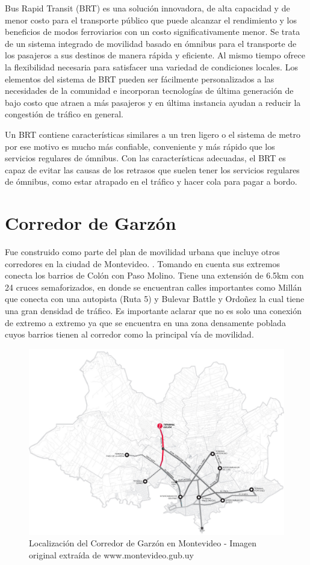 Bus Rapid Transit (BRT) es una solución innovadora, de alta capacidad y de menor costo para el transporte público que puede alcanzar el rendimiento y los beneficios de modos ferroviarios con un costo significativamente menor. Se trata de un sistema integrado de movilidad basado en ómnibus para el transporte de los pasajeros a sus destinos de manera rápida y eficiente. Al mismo tiempo ofrece la flexibilidad necesaria para satisfacer una variedad de condiciones locales. Los elementos del sistema de BRT pueden ser fácilmente personalizados a las necesidades de la comunidad e incorporan tecnologías de última generación de bajo costo que atraen a más pasajeros y en última instancia ayudan a reducir la congestión de tráfico en general.

Un BRT contiene características similares a un tren ligero o el sistema de metro por ese motivo es mucho más confiable, conveniente y más rápido que los servicios regulares de ómnibus. Con las características adecuadas, el BRT es capaz de evitar las causas de los retrasos que suelen tener los servicios regulares de ómnibus, como estar atrapado en el tráfico y hacer cola para pagar a bordo. 


	
\section{Corredor de Garzón}	


Fue construido como parte del plan de movilidad urbana que incluye otros corredores en la ciudad de Montevideo. \citep{PlanMovilidad}. Tomando en cuenta sus extremos conecta los barrios de Colón con Paso Molino. Tiene una extensión de 6.5km con 24 cruces semaforizados, en donde se encuentran calles importantes como Millán que conecta con una autopista (Ruta 5) y Bulevar Battle y Ordoñez la cual tiene una gran densidad de tráfico. Es importante aclarar que no es solo una conexión de extremo a extremo ya que se encuentra en una zona densamente poblada cuyos barrios tienen al corredor como la principal vía de movilidad.

\begin{figure}[H]
	\centering
	\includegraphics[width=0.7\linewidth]{Figures/Mapa_Garzon_0}
	\caption{Localización del Corredor de Garzón en Montevideo - Imagen original extraída de www.montevideo.gub.uy		
	}
	\label{fig:Grafica de costos de otros medios de transporte}
\end{figure}

